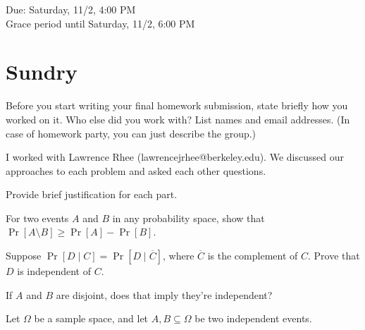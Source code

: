 \documentclass[11pt]{article}
\begin{document}
\maketitle
\fontsize{12}{15}\selectfont

\begin{center}
    Due: Saturday, 11/2, 4:00 PM \\
    Grace period until Saturday, 11/2, 6:00 PM \\
\end{center}

\section*{Sundry}
Before you start writing your final homework submission, state briefly how you worked on it.  Who else did you work with?  List names and email addresses.  (In case of homework party, you can just describe the group.)

\begin{solution}
  I worked with Lawrence Rhee (lawrencejrhee@berkeley.edu). 
  We discussed our approaches to each problem and asked each other questions.  
\end{solution}

\vspace{15pt}


Provide brief justification for each part.

\begin{Parts}

\Part For two events $A$ and $B$ in any probability space, show that $\Pr[A \setminus B] \geq \Pr[A] - \Pr[B]$.

\Part Suppose $\Pr[D \mid C] = \Pr[D \mid \overline{C}]$, where $\overline{C}$ is the complement of $C$. Prove that $D$ is independent of $C$.

\Part  If $A$ and $B$ are disjoint, does that imply they're independent?

\end{Parts}


Let $\Omega$ be a sample space, and let $A,B \subseteq \Omega$ be two independent events.
\end{document}
